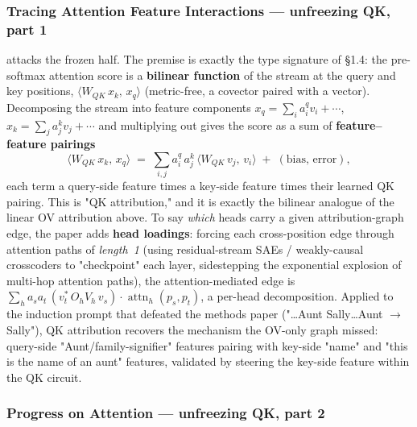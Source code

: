 \subsubsection*{Tracing Attention Feature Interactions --- unfreezing QK, part 1}

\textcite{tracing-attention-feature-interactions} attacks the frozen half. The premise is exactly the type signature of §1.4: the pre-softmax attention score is a \textbf{bilinear function} of the stream at the query and key positions, $\langle W_{QK}\,x_k,\, x_q\rangle$ (metric-free, a covector paired with a vector). Decomposing the stream into feature components $x_q=\sum_i a_i^{q} v_i + \cdots$, $x_k=\sum_j a_j^{k} v_j+\cdots$ and multiplying out gives the score as a sum of \textbf{feature--feature pairings}
\[
\langle W_{QK}\,x_k,\,x_q\rangle
\;=\;
\sum_{i,j} a_i^{q}\,a_j^{k}\,\big\langle W_{QK}\, v_j,\, v_i\big\rangle \;+\;(\text{bias, error}),
\]
each term a query-side feature times a key-side feature times their learned QK pairing. This is "QK attribution," and it is exactly the bilinear analogue of the linear OV attribution above. To say \emph{which} heads carry a given attribution-graph edge, the paper adds \textbf{head loadings}: forcing each cross-position edge through attention paths of \emph{length~1} (using residual-stream SAEs / weakly-causal crosscoders to "checkpoint" each layer, sidestepping the exponential explosion of multi-hop attention paths), the attention-mediated edge is $\sum_{h} a_s a_t\,(v_t^{*}\, O_h V_h\, v_s)\cdot \operatorname{attn}_h(p_s,p_t)$, a per-head decomposition. Applied to the induction prompt that defeated the methods paper ("\dots Aunt Sally\dots Aunt $\to$ Sally"), QK attribution recovers the mechanism the OV-only graph missed: query-side "Aunt/family-signifier" features pairing with key-side "name" and "this is the name of an aunt" features, validated by steering the key-side feature within the QK circuit.

\subsubsection*{Progress on Attention --- unfreezing QK, part 2}

